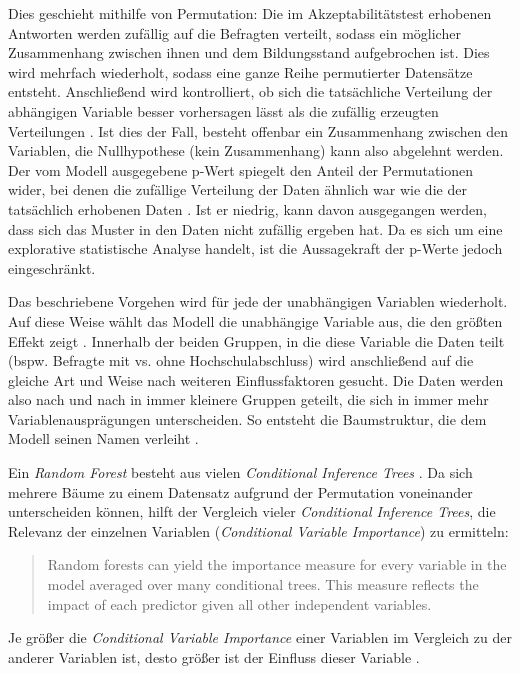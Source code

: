 Dies geschieht mithilfe von Permutation: 
Die im Akzeptabilitätstest erhobenen Antworten werden zufällig auf die Befragten verteilt, sodass ein möglicher Zusammenhang zwischen ihnen und dem Bildungsstand aufgebrochen ist. 
Dies wird mehrfach wiederholt, sodass eine ganze Reihe permutierter Datensätze entsteht. 
Anschließend wird kontrolliert, ob sich die tatsächliche Verteilung der abhängigen Variable besser vorhersagen lässt als die zufällig erzeugten Verteilungen \citep[s.][292]{Levshina.2015}.
Ist dies der Fall, besteht offenbar ein Zusammenhang zwischen den Variablen, die Nullhypothese (kein Zusammenhang) kann also abgelehnt werden. 
Der vom Modell ausgegebene p-Wert spiegelt den Anteil der Permutationen wider, bei denen die zufällige Verteilung der Daten ähnlich war wie die der tatsächlich erhobenen Daten \citep[s.][292]{Levshina.2015}. 
Ist er niedrig, kann davon ausgegangen werden, dass sich das Muster in den Daten nicht zufällig ergeben hat. 
Da es sich um eine explorative statistische Analyse handelt, ist die Aussagekraft der p-Werte jedoch eingeschränkt. 

Das beschriebene Vorgehen wird für jede der unabhängigen Variablen wiederholt. 
Auf diese Weise wählt das Modell die unabhängige Variable aus, die den größten Effekt zeigt \citep[s.][291]{Levshina.2015}.
Innerhalb der beiden Gruppen, in die diese Variable die Daten teilt (bspw. Befragte mit vs. ohne Hochschulabschluss) wird anschließend auf die gleiche Art und Weise nach weiteren Einflussfaktoren gesucht. 
Die Daten werden also nach und nach in immer kleinere Gruppen geteilt, die sich in immer mehr Variablenausprägungen unterscheiden. 
So entsteht die Baumstruktur, die dem Modell seinen Namen verleiht \citep[s.][291]{Levshina.2015}.

Ein \textit{Random Forest} besteht aus vielen \textit{Conditional Inference Trees} \citep[s.][292]{Levshina.2015}. 
Da sich mehrere Bäume zu einem Datensatz aufgrund der Permutation voneinander unterscheiden können, hilft der Vergleich vieler \textit{Conditional Inference Trees}, die Relevanz der einzelnen Variablen (\textit{Conditional Variable Importance}) zu ermitteln:
\begin{quote} Random forests can yield the importance measure for every variable in the model averaged over many conditional trees. This measure reflects the impact of each predictor given all other independent variables. \citep[292]{Levshina.2015}\end{quote}
Je größer die \textit{Conditional Variable Importance} einer Variablen im Vergleich zu der anderer Variablen ist, desto größer ist der Einfluss dieser Variable \citep[s.][298--299]{Levshina.2015}. 

